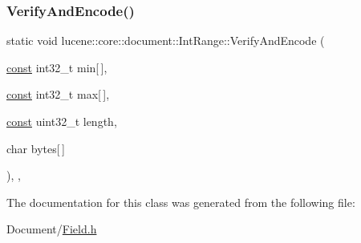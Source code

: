 \subsubsection{\texorpdfstring{Verify\+And\+Encode()}{VerifyAndEncode()}}
{\footnotesize\ttfamily static void lucene\+::core\+::document\+::\+Int\+Range\+::\+Verify\+And\+Encode (\begin{DoxyParamCaption}\item[{\mbox{\hyperlink{ZlibCrc32_8h_a2c212835823e3c54a8ab6d95c652660e}{const}} int32\+\_\+t}]{min\mbox{[}$\,$\mbox{]},  }\item[{\mbox{\hyperlink{ZlibCrc32_8h_a2c212835823e3c54a8ab6d95c652660e}{const}} int32\+\_\+t}]{max\mbox{[}$\,$\mbox{]},  }\item[{\mbox{\hyperlink{ZlibCrc32_8h_a2c212835823e3c54a8ab6d95c652660e}{const}} uint32\+\_\+t}]{length,  }\item[{char}]{bytes\mbox{[}$\,$\mbox{]} }\end{DoxyParamCaption})\hspace{0.3cm}{\ttfamily [inline]}, {\ttfamily [static]}, {\ttfamily [private]}}



The documentation for this class was generated from the following file\+:\begin{DoxyCompactItemize}
\item 
Document/\mbox{\hyperlink{Document_2Field_8h}{Field.\+h}}\end{DoxyCompactItemize}
